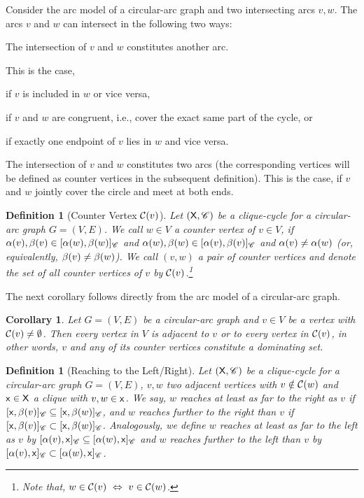 \documentclass[10pt]{article}
\newtheorem{corollary}[theorem]{Corollary}
\newtheorem{definition}[theorem]{Definition}
\begin{document}
Consider the arc model of a circular-arc graph and two intersecting arcs $v,w$.
The arcs $v$ and $w$ can intersect in the following two ways:
\begin{inparaenum}
\item
The intersection of $v$ and $w$ constitutes another arc.
\begin{inparaenum}
This is the case,
\item
if $v$ is included in $w$ or vice versa,
\item
if $v$ and $w$ are congruent, 
i.e., cover the exact same part of the cycle, or 
\item
if exactly one endpoint of $v$ lies in $w$ and vice versa.
\end{inparaenum}
\item
The intersection of $v$ and $w$ constitutes two arcs (the corresponding vertices will 
be defined as counter vertices in the subsequent definition).
This is the case, if $v$ and $w$ jointly cover the circle and meet at both ends.
\end{inparaenum}


\begin{definition}[Counter Vertex $\mathcal{C}({v})$]\label{reaches}
Let $(\mathsf{X},\mathscr{C})$ be a clique-cycle for a circular-arc graph $G=(V,E)$.
We call $w\in V$ a \emph{counter vertex} of $v\in V$, if $\alpha(v),\beta(v)\in[\alpha(w),\beta(w)]_{\mathscr{C}}$ and $\alpha(w),\beta(w)\in[\alpha(v),\beta(v)]_{\mathscr{C}}$ and $\alpha(v)\neq{\alpha(w)}$ (or, equivalently, $\beta(v)\neq{\beta(w)}$).
We call $(v,w)$ a \emph{pair of counter vertices} and denote the set of all counter 
vertices of $v$ by $\mathcal{C}({v})$.\footnote{Note that, $w\in\mathcal{C}({v})~\Leftrightarrow~v\in\mathcal{C}({w})$.}
\end{definition}

The next corollary follows directly from the arc model of a circular-arc graph.


\begin{corollary}\label{adjacentToVorCoV}
Let $G=(V,E)$ be a circular-arc graph and $v\in V$ be a vertex 
with $\mathcal{C}({v})\neq\emptyset$. Then every vertex in $V$ is adjacent 
to $v$ or to every vertex in $\mathcal{C}({v})$, in other words, $v$ and 
any of its counter vertices constitute a dominating set.
\end{corollary}



\begin{definition}[Reaching to the Left/Right]\label{defi:reaches}
Let $(\mathsf{X},\mathscr{C})$ be a clique-cycle for a circular-arc graph $G=(V,E)$, $v,w$ two adjacent vertices with $v\notin\mathcal{C}({w})$ and $\mathsf{x}\in \mathsf{X}$ a clique with $v,w\in \mathsf{x}$.
We say, \emph{$w$ reaches at least as 
far to the right as $v$} if $[\mathsf{x},\beta(v)]_{\mathscr{C}}\subseteq [\mathsf{x},\beta(w)]_{\mathscr{C}}$, 
and \emph{$w$ reaches further to the right than $v$} 
if $[\mathsf{x},\beta(v)]_{\mathscr{C}}\subset [\mathsf{x},\beta(w)]_{\mathscr{C}}$.
Analogously, we define \emph{$w$ reaches at least as 
far to the left as $v$} by $[\alpha(v),\mathsf{x}]_{\mathscr{C}}\subseteq [\alpha(w),\mathsf{x}]_{\mathscr{C}}$ 
and \emph{$w$ reaches further to the left than $v$} 
by $[\alpha(v),\mathsf{x}]_{\mathscr{C}}\subset [\alpha(w),\mathsf{x}]_{\mathscr{C}}$.
\end{definition}
\end{document}

